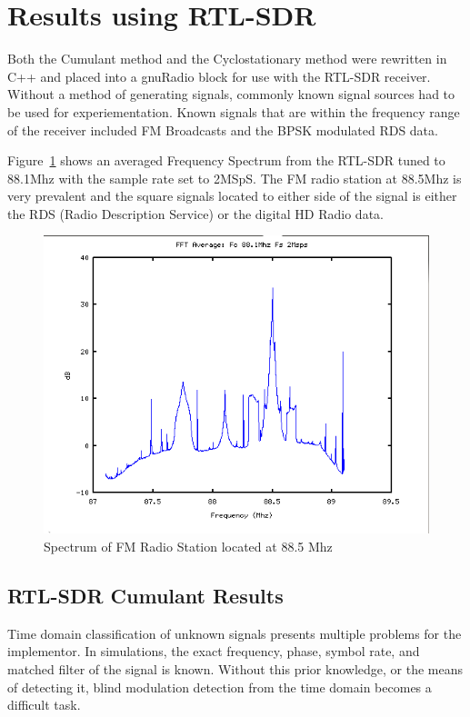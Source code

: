 \section*{Results using RTL-SDR}

Both the Cumulant method and the Cyclostationary method were rewritten in C++
and placed into a gnuRadio block for use with the RTL-SDR receiver.  Without a
method of generating signals, commonly known signal sources had to be used for
experiementation.  Known signals that are within the frequency range of
the receiver included FM Broadcasts and the BPSK modulated RDS data.

Figure~\ref{fig:SignalOfInterest} shows an averaged Frequency Spectrum from the
RTL-SDR tuned to 88.1Mhz with the sample rate set to 2MSpS.  The FM radio
station at 88.5Mhz is very prevalent and the square signals located to either
side of the signal is either the RDS (Radio Description Service) or the
digital HD Radio data.  

\begin{figure}
\centering
\includegraphics[width=\linewidth]{../img/Report_RTL_SDR_FFT_881M_2Msps.png}
\caption{Spectrum of FM Radio Station located at 88.5 Mhz}
\label{fig:SignalOfInterest}
\end{figure}


\subsection*{RTL-SDR Cumulant Results}

Time domain classification of unknown signals presents multiple problems
for the implementor.  In simulations, the exact frequency, phase, symbol rate,
and matched filter of the signal is known.  Without this prior knowledge, or the
means of detecting it, blind modulation detection from the time domain becomes a
difficult task.
 
